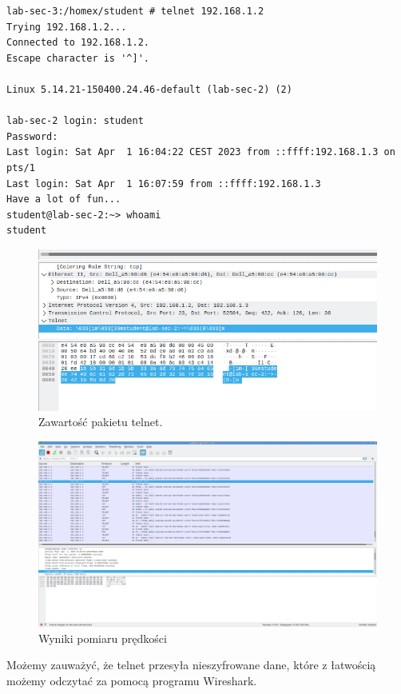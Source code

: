 \documentclass[polish, a4paper]{article}
\begin{document}
\begin{verbatim}
lab-sec-3:/homex/student # telnet 192.168.1.2
Trying 192.168.1.2...
Connected to 192.168.1.2.
Escape character is '^]'.

Linux 5.14.21-150400.24.46-default (lab-sec-2) (2)

lab-sec-2 login: student
Password: 
Last login: Sat Apr  1 16:04:22 CEST 2023 from ::ffff:192.168.1.3 on pts/1
Last login: Sat Apr  1 16:07:59 from ::ffff:192.168.1.3
Have a lot of fun...
student@lab-sec-2:~> whoami
student
\end{verbatim}

\begin{figure}[H]
\centering
\includegraphics[width=\textwidth]{zdj2.png}
\caption{Zawartość pakietu telnet.}
\end{figure}

\begin{figure}[H]
\centering
\includegraphics[width=\textwidth]{zdj3.png}
\caption{Wyniki pomiaru prędkości}
\end{figure}

Możemy zauważyć, że telnet przesyła nieszyfrowane dane, które z łatwością możemy odczytać za pomocą programu Wireshark.
\end{document}
